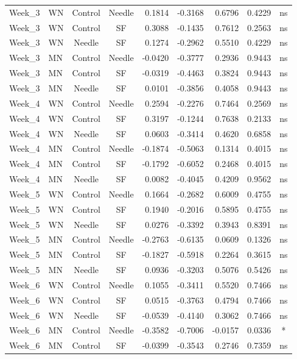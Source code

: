 \documentclass[
  12pt,
  letterpaper,
]{article}
\begin{document}
\begin{longtable}{llccrrrlc}
Week\_3 & WN & Control & Needle & 0.1814 & -0.3168 & 0.6796 & 0.4229 & ns \\ 
Week\_3 & WN & Control & SF & 0.3088 & -0.1435 & 0.7612 & 0.2563 & ns \\ 
Week\_3 & WN & Needle & SF & 0.1274 & -0.2962 & 0.5510 & 0.4229 & ns \\ 
Week\_3 & MN & Control & Needle & -0.0420 & -0.3777 & 0.2936 & 0.9443 & ns \\ 
Week\_3 & MN & Control & SF & -0.0319 & -0.4463 & 0.3824 & 0.9443 & ns \\ 
Week\_3 & MN & Needle & SF & 0.0101 & -0.3856 & 0.4058 & 0.9443 & ns \\ 
Week\_4 & WN & Control & Needle & 0.2594 & -0.2276 & 0.7464 & 0.2569 & ns \\ 
Week\_4 & WN & Control & SF & 0.3197 & -0.1244 & 0.7638 & 0.2133 & ns \\ 
Week\_4 & WN & Needle & SF & 0.0603 & -0.3414 & 0.4620 & 0.6858 & ns \\ 
Week\_4 & MN & Control & Needle & -0.1874 & -0.5063 & 0.1314 & 0.4015 & ns \\ 
Week\_4 & MN & Control & SF & -0.1792 & -0.6052 & 0.2468 & 0.4015 & ns \\ 
Week\_4 & MN & Needle & SF & 0.0082 & -0.4045 & 0.4209 & 0.9562 & ns \\ 
Week\_5 & WN & Control & Needle & 0.1664 & -0.2682 & 0.6009 & 0.4755 & ns \\ 
Week\_5 & WN & Control & SF & 0.1940 & -0.2016 & 0.5895 & 0.4755 & ns \\ 
Week\_5 & WN & Needle & SF & 0.0276 & -0.3392 & 0.3943 & 0.8391 & ns \\ 
Week\_5 & MN & Control & Needle & -0.2763 & -0.6135 & 0.0609 & 0.1326 & ns \\ 
Week\_5 & MN & Control & SF & -0.1827 & -0.5918 & 0.2264 & 0.3615 & ns \\ 
Week\_5 & MN & Needle & SF & 0.0936 & -0.3203 & 0.5076 & 0.5426 & ns \\ 
Week\_6 & WN & Control & Needle & 0.1055 & -0.3411 & 0.5520 & 0.7466 & ns \\ 
Week\_6 & WN & Control & SF & 0.0515 & -0.3763 & 0.4794 & 0.7466 & ns \\ 
Week\_6 & WN & Needle & SF & -0.0539 & -0.4140 & 0.3062 & 0.7466 & ns \\ 
Week\_6 & MN & Control & Needle & -0.3582 & -0.7006 & -0.0157 & 0.0336 & * \\ 
Week\_6 & MN & Control & SF & -0.0399 & -0.3543 & 0.2746 & 0.7359 & ns \\ 

\end{longtable}
\end{document}
